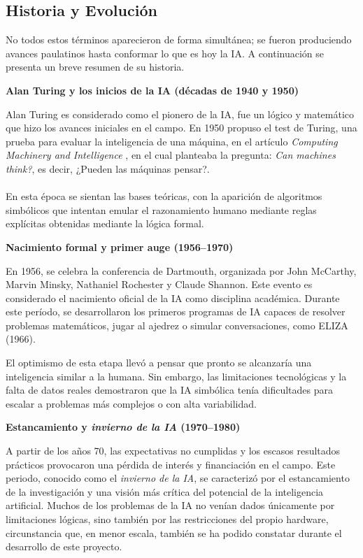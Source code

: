 \newpage
\subsection{Historia y Evolución}
No todos estos términos aparecieron de forma simultánea; se fueron produciendo avances paulatinos hasta conformar lo que es hoy la IA. A continuación se presenta un breve resumen de su historia.

\vspace{0.3cm}
\textbf{Alan Turing y los inicios de la IA (décadas de 1940 y 1950)}

Alan Turing es considerado como el pionero de la IA, fue un lógico y matemático que hizo los avances iniciales en el campo. En 1950 propuso el test de Turing, una prueba para evaluar la inteligencia de una máquina, en el artículo \textit{Computing Machinery and Intelligence} \cite{Turing1950}, en el cual planteaba la pregunta: \textit{Can machines think?}, es decir, ¿Pueden las máquinas pensar?.\\
\\
En esta época se sientan las bases teóricas, con la aparición de algoritmos simbólicos que intentan emular el razonamiento humano mediante reglas explícitas obtenidas mediante la lógica formal.

\vspace{0.3cm}
\textbf{Nacimiento formal y primer auge (1956–1970)}

En 1956, se celebra la conferencia de Dartmouth, organizada por John McCarthy, Marvin Minsky, Nathaniel Rochester y Claude Shannon. Este evento es considerado el nacimiento oficial de la IA como disciplina académica. Durante este período, se desarrollaron los primeros programas de IA capaces de resolver problemas matemáticos, jugar al ajedrez o simular conversaciones, como ELIZA (1966).

El optimismo de esta etapa llevó a pensar que pronto se alcanzaría una inteligencia similar a la humana. Sin embargo, las limitaciones tecnológicas y la falta de datos reales demostraron que la IA simbólica tenía dificultades para escalar a problemas más complejos o con alta variabilidad.

\vspace{0.3cm}
\textbf{Estancamiento y \textit{invierno de la IA} (1970–1980)}

A partir de los años 70, las expectativas no cumplidas y los escasos resultados prácticos provocaron una pérdida de interés y financiación en el campo. Este periodo, conocido como el \textit{invierno de la IA}, se caracterizó por el estancamiento de la investigación y una visión más crítica del potencial de la inteligencia artificial. Muchos de los problemas de la IA no venían dados únicamente por limitaciones lógicas, sino también por las restricciones del propio hardware, circunstancia que, en menor escala, también se ha podido constatar durante el desarrollo de este proyecto.

